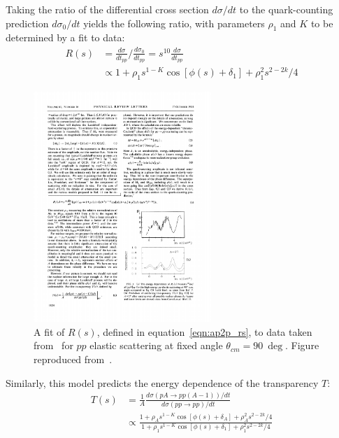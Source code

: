 Taking the ratio of the differential cross section $d\sigma/dt$ to the
quark-counting prediction $d\sigma_0/dt$
yields the following ratio, with parameters $\rho_1$ and $K$ to be determined
by a fit to data:
\begin{align} \label{eqn:ap2p_rs}
    R(s) &= \frac{d\sigma}{dt_{pp}} \bigg/ \frac{d\sigma_0}{dt_{pp}}
          = s^{10} \frac{d\sigma}{dt_{pp}} \\
         &\propto 1 + \rho_1 s^{1-K} \cos\left[\phi(s)+\delta_1\right] + \rho_1^2 s^{2-2k}/4
\end{align}

\begin{figure}[!h]
    \centering
    \includegraphics[width=0.6\textwidth]{chap2/pire_1982_R}
    \caption{A fit of $R(s)$, defined in equation~\ref{eqn:ap2p_rs}, to data taken from~\cite{Sivers_1976}
             for $pp$ elastic scattering at fixed angle
             $\theta_{cm}=\SI{90}{\deg}$.
             Figure reproduced from~\cite{Pire_1982}.
            }
    \label{fig:pire_1982_R}
\end{figure}

Similarly, this model predicts the energy dependence of the transparency $T$:
\begin{align}
    T(s) &= \frac{1}{A}\frac{d\sigma\left(pA \rightarrow pp(A-1)\right)/dt}
                            {d\sigma\left(pp \rightarrow pp\right)/dt} \\
         &\propto \frac{1 + \rho_A s^{1-K} \cos\left[\phi(s)+\delta_A\right] + \rho_A^2 s^{2-2k}/4}
                       {1 + \rho_1 s^{1-K} \cos\left[\phi(s)+\delta_1\right] + \rho_1^2 s^{2-2k}/4}
\end{align}


